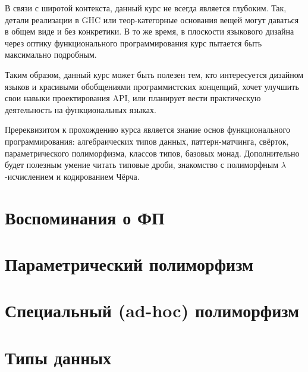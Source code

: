 \documentclass[12pt]{article}
\begin{document}
    В связи с широтой контекста, данный курс не всегда является глубоким.
    Так, детали реализации в GHC или теор-категорные основания вещей могут даваться в общем виде и без конкретики.
    В то же время, в плоскости языкового дизайна через оптику функционального программирования курс пытается быть максимально подробным.

    Таким образом, данный курс может быть полезен тем, кто интересуется дизайном языков и красивыми обобщениями программистских концепций, хочет улучшить свои навыки проектирования API, или планирует вести практическую деятельность на функциональных языках.

    Пререквизитом к прохождению курса является знание основ функционального программирования: алгебраических типов данных, паттерн-матчинга, свёрток, параметрического полиморфизма, классов типов, базовых монад.
    Дополнительно будет полезным умение читать типовые дроби, знакомство с полиморфным $\lambda$-исчислением и кодированием Чёрча.


    \clearpage


    \section{Воспоминания о ФП}

    

    \clearpage


    \section{Параметрический полиморфизм} \label{sec:parametric-polymorphism}

    

    \clearpage


    \section{Специальный (ad-hoc) полиморфизм} \label{sec:ad-hoc}

    

    \clearpage


    \section{Типы данных} \label{sec:data-common}

    

\end{document}
